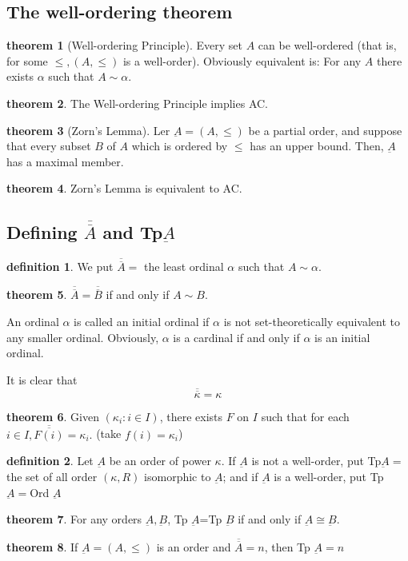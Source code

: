\documentclass[a4paper,11pt]{article}%
\theoremstyle{remark}
\theoremstyle{definition}
\newtheorem{theorem}{theorem}[section]
\theoremstyle{definition}
\newtheorem*{definition}{definition}
\theoremstyle{plain}
\theoremstyle{definition}
\begin{document}
\subsection{The well-ordering theorem}
\begin{theorem}[Well-ordering Principle]
   Every set $A$ can be well-ordered (that is, for some $\leq,(A,\leq)$ is a well-order).
   Obviously equivalent is: For any $A$ there exists $\alpha$ such that $A\sim\alpha$. 
\end{theorem}
\begin{theorem}
    The Well-ordering Principle implies AC.
\end{theorem}
\begin{theorem}[Zorn's Lemma]
    Ler $\underbar{A}=(A,\leq)$ be a partial order, and suppose that every 
    subset $B$ of $A$ which is ordered by $\leq$ has an upper bound. Then, $\underbar{A}$ 
    has a maximal member.
\end{theorem}
\begin{theorem}
    Zorn's Lemma is equivalent to AC.
\end{theorem}
\subsection{Defining $\overline{\overline{A}}$ and Tp$\underbar{A}$}
\begin{definition}
    We put $\overline{\overline{A}}=$ the least ordinal $\alpha$ such that 
    $A\sim\alpha$.
\end{definition}
\begin{theorem}
    $\overline{\overline{A}}=\overline{\overline{B}}$ if and only if $A\sim B$.
\end{theorem}
An ordinal $\alpha$ is called an initial ordinal if $\alpha$ is not set-theoretically
equivalent to any smaller ordinal. Obviously, $\alpha$ is a cardinal if and 
only if $\alpha$ is an initial ordinal. 

It is clear that 
\[\overline{\overline{\kappa}}=\kappa\]
\begin{theorem}
    Given $(\kappa_i:i\in I)$, there exists $F$ on $I$ such that for each $i\in I,\overline{\overline{F(i)}}=\kappa_i.$
    (take $f(i)=\kappa_i$)
\end{theorem}
\begin{definition}
    Let $\underbar{A}$ be an order of power $\kappa$. If $\underbar{A}$
    is not a well-order, put Tp$\underbar{A}=$ the set of all order $(\kappa,R)$
    isomorphic to $\underbar{A}$; and if $\underbar{A}$ is a well-order, put Tp $\underbar{A}=$Ord $\underbar{A}$
\end{definition}
\begin{theorem}
    For any orders $\underbar{A},\underbar{B}$, Tp $\underbar{A}$=Tp $\underbar{B}$ 
    if and only if $\underbar{A}\cong\underbar{B}$.
\end{theorem}
\begin{theorem}
    If $\underbar{A}=(A,\leq)$ is an order and $\overline{\overline{A}}=n$, then Tp $\underbar{A}=n$
\end{theorem}
\end{document}
